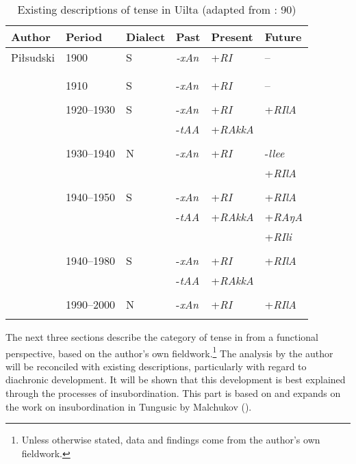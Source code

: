 \documentclass[output=paper,colorlinks,citecolor=brown]{langscibook}
\begin{document}
\begin{table}
\caption{Existing descriptions of tense in Uilta (adapted from \citealt{Yamada_2013}: 90)}
\label{table:2}
 \begin{tabular}{p{3.3cm}lllll}
  \lsptoprule
            Author &	Period &	Dialect &	Past &	Present &	Future\\
  \midrule
  Piłsudski  &	1900 &	S &	\textit{-xAn} &	+\textit{RI} &	–\\
  \citep{Majewicz_2011}\\\\
  \citealt{Nakanome_1917} &	1910 &	S &	-\textit{xAn} &	+\textit{RI} &	–\\\\
  \citealt{Magata_1981} &	1920--1930 &	S &	-\textit{xAn} &	+\textit{RI} &	+\textit{RIlA}\\
	& & & 		-\textit{tAA} &	 +\textit{RAkkA}	& \\\\
  \citealt{Petrova_1967} &	1930--1940 &	N &	-\textit{xAn} &	+\textit{RI} &	-\textit{llee}\\
	& & & & & 				+\textit{RIlA}\\\\
  \citealt{Ikegami_1959} &	1940--1950 &	S &	-\textit{xAn} &	+\textit{RI} &	+\textit{RIlA}\\
	& & &		-\textit{tAA} &	 +\textit{RAkkA} &	+\textit{RAŋA}\\
		& & & & & 			+\textit{RIli}\\\\
  \citealt{Tsumagari_2009} &	1940--1980 &	S &	-\textit{xAn} &	+\textit{RI} &	+\textit{RIlA}\\
	& & &		-\textit{tAA} &	 +\textit{RAkkA}	&\\\\
  \citealt{Ozolinja_2013} &	1990--2000 &	N &	-\textit{xAn} &	+\textit{RI} &	+\textit{RIlA}\\
  \lspbottomrule
 \end{tabular}
\end{table}

The next three sections describe the category of tense in  from a functional perspective, based on the author’s own fieldwork.\footnote{Unless otherwise stated,  data and findings come from the author’s own fieldwork.} The analysis by the author will be reconciled with existing descriptions, particularly with regard to diachronic development. It will be shown that this development is best explained through the processes of insubordination. This part is based on and expands on the work on insubordination in Tungusic by Malchukov (\citeyear{Malchukov_2000, Malchukov_2013}).
\end{document}
